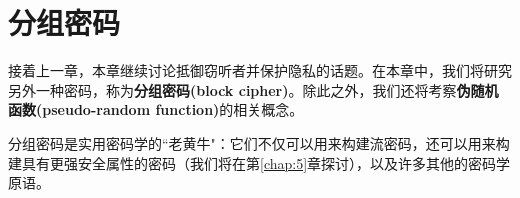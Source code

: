 \chapter{分组密码}\label{chap:4}

接着上一章，本章继续讨论抵御窃听者并保护隐私的话题。在本章中，我们将研究另外一种密码，称为\textbf{分组密码(block cipher)}。除此之外，我们还将考察\textbf{伪随机函数(pseudo-random function)}的相关概念。

分组密码是实用密码学的``老黄牛"：它们不仅可以用来构建流密码，还可以用来构建具有更强安全属性的密码（我们将在第\ref{chap:5}章探讨），以及许多其他的密码学原语。











